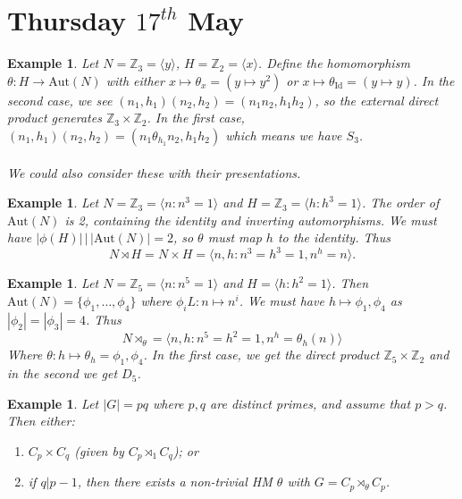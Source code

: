 \documentclass[a4paper,10pt]{article}
\newcommand{\ZZ}{\mathbb{Z}}
\newtheorem{eg}[thm]{Example}
\begin{document}
\newpage
\section{Thursday $17^{th}$ May}

\begin{eg}
Let $N = \ZZ_3 = \langle y \rangle $, $H = \ZZ_2 = \langle x \rangle$. Define the homomorphism $\theta : H \rightarrow \text{Aut}(N)$ with either $x \mapsto \theta_x = (y \mapsto y^2)$ or $x \mapsto \theta_{\text{Id}} = (y \mapsto y)$. In the second case, we see $(n_1, h_1)(n_2, h_2) = (n_1 n_2, h_1h_2)$, so the external direct product generates $\ZZ_3 \times \ZZ_2$. In the first case, $(n_1, h_1)(n_2, h_2) = (n_1 \theta_{h_1} n_2, h_1 h_2)$ which means we have $S_3$. \\
\\
We could also consider these with their presentations.
\end{eg}

\begin{eg}
Let $N = \ZZ_3 = \langle n : n^3 = 1 \rangle$ and $H = \ZZ_3 = \langle h : h^3 = 1 \rangle$.
The order of $\text{Aut}(N)$ is 2, containing the identity and inverting automorphisms. We must have $| \phi(H) | \, \big| \, |\text{Aut}(N) | = 2$, so $\theta$ must map $h$ to the identity. Thus
\[ N \rtimes H = N \times H = \langle n,h : n^3 = h^3 = 1, n^h = n \rangle. \]
\end{eg}

\begin{eg}
Let $N = \ZZ_5 = \langle n : n^5 = 1 \rangle$ and $H = \langle h : h^2 = 1 \rangle$. Then $\text{Aut}(N) = \{ \phi_1, \dots, \phi_4 \}$ where $\phi_i L: n \mapsto n^i$. We must have $h \mapsto \phi_1, \phi_4$ as $|\phi_2| = |\phi_3| = 4$. Thus
\[ N \rtimes_\theta = \langle n,h : n^5 = h^2 = 1, n^h = \theta_h(n) \rangle \]
Where $\theta : h \mapsto \theta_h = \phi_1, \phi_4$. In the first case, we get the direct product $\ZZ_5 \times \ZZ_2$ and in the second we get $D_5$. 
\end{eg}

\begin{eg}
Let $|G| = pq$ where $p,q$ are distinct primes, and assume that $p > q$. Then either:
\begin{enumerate}
\item $C_p \times C_q$ (given by $C_p \rtimes_1 C_q$); or
\item if $q | p -1$, then there exists a non-trivial HM $\theta$ with $G = C_p \rtimes_\theta C_p$.
\end{enumerate}

\end{eg}
\end{document}
